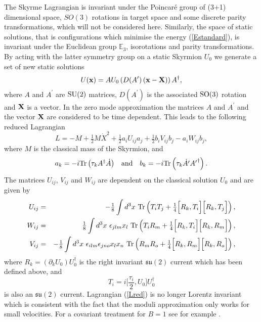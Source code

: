 \documentclass[a4paper,12pt]{article}
\begin{document}
The Skyrme Lagrangian is invariant under the Poincar\'e group of (3+1) 
dimensional space, $SO(3)$ rotations in target space and some discrete 
parity transformations, which will not be considered here. 
Similarly, the space of static solutions, that is configurations which 
minimise the energy (\ref{Estandard}), is invariant under the Euclidean 
group ${\mathbb E}_3$, isorotations and parity transformations. 
By acting with the latter symmetry group on a static Skyrmion $U_0$ 
we generate a set of new static solutions
%
\begin{equation}
\label{zeromodes}
U({\bf x}) = A U_0 \left(D(A^\prime) \left({\bf x}-{\bf X}\right)\right)
A^\dagger,
\end{equation}
%
where $A$ and $A^\prime$ are ${\rm SU}(2)$ matrices, $D(A^\prime)$ is
the  associated  ${\rm SO}(3)$ rotation and ${\bf X}$ is a vector. In
the zero mode approximation the matrices $A$ and $A^\prime$ and
the vector ${\bf X}$ are considered to be time dependent. This leads
to the following reduced Lagrangian
%
\begin{equation}
\label{Lred}
L = -M + \tfrac{1}{2} M {\dot X}^2 + \tfrac{1}{2} a_i U_{ij} a_j  +
\tfrac{1}{2} b_i V_{ij} b_j - a_i W_{ij} b_j,
\end{equation}
%
where $M$ is the classical mass of the Skyrmion, and
%
\begin{equation}
\begin{array}{c c c}
a_k = -i {\rm Tr} \left(\tau_k A^\dagger {\dot A} \right)  & {\rm and}
&   b_k = -i {\rm Tr} \left(\tau_k {\dot {A^\prime}} 
{A^\prime}^\dagger \right).
\end{array}
\end{equation}
%
The matrices $U_{ij}$, $V_{ij}$ and $W_{ij}$ are dependent on the
classical solution $U_0$ and are given by \cite{Braaten:1988cc} 
%
\begin{eqnarray}
\label{intU}
U_{ij} &=& - \tfrac{1}{8} \int d^3 x~ {\rm Tr} \left( T_i T_j +
\tfrac{1}{4} \Big[R_k, T_i \Big] \Big[R_k, T_j \Big] \right), \\ 
\label{intW}
W_{ij} &=&
\tfrac{1}{8} \int d^3 x~ \epsilon_{jlm} x_l~  {\rm Tr} \left( T_i R_m +
\tfrac{1}{4} \Big[R_k, T_i \Big] \Big[R_k, R_m \Big] \right),\\ 
\label{intV}
V_{ij}
&=& -\tfrac{1}{8} \int d^3 x~ \epsilon_{ilm} \epsilon_{jno} x_l x_n~
{\rm Tr} \left( R_m R_o + 
\tfrac{1}{4} \Big[R_k, R_m \Big] \Big[R_k, R_o \Big]
\right),
\end{eqnarray}
%
where $R_k = (\partial_k U_0) U_0^\dagger$ is the right invariant 
${\mathfrak{su}}(2)$ current which has been defined above, and 
%
\begin{equation}
T_i = i \Big[\frac{\tau_i}{2},U_0 \Big] U_0^\dagger
\end{equation}
%
is also an ${\mathfrak{su}}(2)$ current.
Lagrangian (\ref{Lred}) is no longer Lorentz invariant which is consistent 
with the fact that the moduli approximation only works for small 
velocities. For a covariant treatment for $B=1$ see for example 
\cite{Kruczenski:1997xc}.
\end{document}

